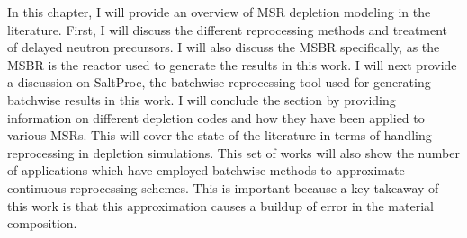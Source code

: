 \renewcommand*\descriptionlabel[1]{\hspace\leftmargin$#1$}
\setcounter{tocdepth}{5}
\setcounter{secnumdepth}{5}


In this chapter, I will provide an overview of MSR depletion modeling in the literature. First, I will discuss the different reprocessing methods and treatment of delayed neutron precursors. I will also discuss the MSBR specifically, as the MSBR is the reactor used to generate the results in this work.
I will next provide a discussion on SaltProc, the batchwise reprocessing tool used for generating batchwise results in this work.
I will conclude the section by providing information on different depletion codes and how they have been applied to various MSRs. This will cover the state of the literature in terms of handling reprocessing in depletion simulations. This set of works will also show the number of applications which have employed batchwise methods to approximate continuous reprocessing schemes. This is important because a key takeaway of this work is that this approximation causes a buildup of error in the material composition.



